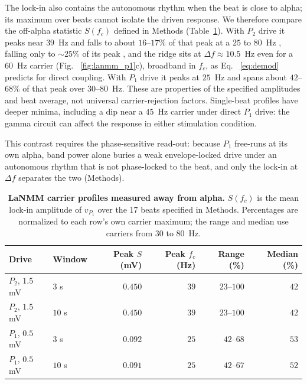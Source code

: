 \documentclass[11pt,a4paper]{article}
\providecommand{\DIFaddtex}[1]{{\protect\color{blue} \sf #1}} %
\providecommand{\DIFdeltex}[1]{{\protect\color{red} \scriptsize #1}} %
\providecommand{\DIFaddbegin}{} %
\providecommand{\DIFaddend}{} %
\providecommand{\DIFdelbegin}{} %
\providecommand{\DIFdelend}{} %
\providecommand{\DIFaddFL}[1]{\DIFadd{#1}} %
\providecommand{\DIFadd}[1]{\texorpdfstring{\DIFaddtex{#1}}{#1}} %
\providecommand{\DIFdel}[1]{\texorpdfstring{\DIFdeltex{#1}}{}} %
\begin{document}
\DIFadd{The lock-in also contains the autonomous rhythm when the beat is close to alpha;
its maximum over beats cannot isolate the driven response. We therefore compare
the off-alpha statistic $S(f_c)$ defined in Methods (Table~\ref{tab:lanmm-carrier}).
With $P_2$ drive it peaks near $39$~Hz and falls to about $16$--$17\%$ of that
peak at a }\DIFaddend $25$\DIFdelbegin \DIFdel{to $80$~Hz , falling only to $\sim$25\% of its peak , and the
ridge sits at $\Delta f\!\approx\!10.5$~Hz even for a $60$}\DIFdelend ~Hz carrier\DIFdelbegin \DIFdel{(Fig. ~\ref{fig:lanmm_p1}c), broadband in $f_c$, as Eq.
~\eqref{eq:demod} predicts for
direct coupling}\DIFdelend . \DIFaddbegin \DIFadd{With $P_1$ drive it peaks at $25$~Hz and spans about
$42$--$68\%$ of that peak over $30$--$80$~Hz. These are properties of the
specified amplitudes and beat average, not universal carrier-rejection factors.
Single-beat profiles have deeper minima, including a dip near a $45$~Hz carrier
under direct $P_1$ drive: the gamma circuit can affect the response in either
stimulation condition.
}\DIFaddend

\DIFdelbegin \DIFdel{This contrast requires the phase-sensitive read-out: because $P_1$ free-runs at its own alpha, band power alone buries a weak envelope-locked drive under an autonomous rhythm that is not phase-locked to the beat, and only the lock-in at $\Delta f$ separates the two (Methods).}\DIFdelend

\DIFaddbegin \begin{table}[t!]
\centering\small
\caption{\DIFaddFL{\textbf{LaNMM carrier profiles measured away from alpha.}
$S(f_c)$ is the mean lock-in amplitude of $v_{P_1}$ over the 17 beats specified
in Methods. Percentages are normalized to each row's own carrier maximum;
the range and median use carriers from $30$ to $80$~Hz.}}
\label{tab:lanmm-carrier}
\begin{tabular}{@{}llrrrr@{}}
\toprule
\DIFaddFL{Drive }& \DIFaddFL{Window }& \DIFaddFL{Peak $S$ (mV) }& \DIFaddFL{Peak $f_c$ (Hz) }& \DIFaddFL{Range (\%) }& \DIFaddFL{Median (\%)}\\
\midrule
\DIFaddFL{$P_2$, $1.5$ mV }& \DIFaddFL{$3$ s  }& \DIFaddFL{$0.450$ }& \DIFaddFL{$39$ }& \DIFaddFL{$23$--$100$ }& \DIFaddFL{$42$}\\
\DIFaddFL{$P_2$, $1.5$ mV }& \DIFaddFL{$10$ s }& \DIFaddFL{$0.450$ }& \DIFaddFL{$39$ }& \DIFaddFL{$23$--$100$ }& \DIFaddFL{$42$}\\
\DIFaddFL{$P_1$, $0.5$ mV }& \DIFaddFL{$3$ s  }& \DIFaddFL{$0.092$ }& \DIFaddFL{$25$ }& \DIFaddFL{$42$--$68$  }& \DIFaddFL{$53$}\\
\DIFaddFL{$P_1$, $0.5$ mV }& \DIFaddFL{$10$ s }& \DIFaddFL{$0.091$ }& \DIFaddFL{$25$ }& \DIFaddFL{$42$--$67$  }& \DIFaddFL{$52$}\\
\bottomrule
\end{tabular}
\end{table}
\end{document}
